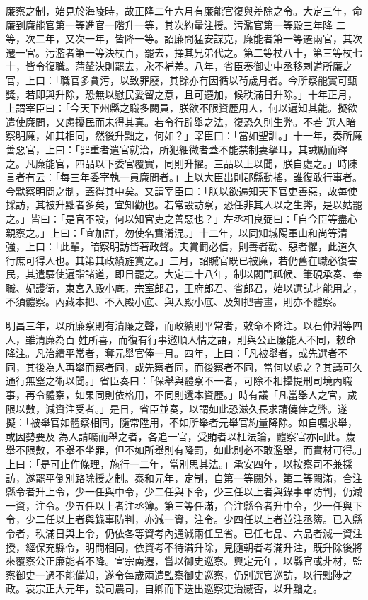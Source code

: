 \begin{pinyinscope}
 廉察之制，始見於海陵時，故正隆二年六月有廉能官復與差除之令。大定三年，命廉到廉能官第一等進官一階升一等，其次約量注授。污濫官第一等殿三年降
 二等，次二年，又次一年，皆降一等。詔廉問猛安謀克，廉能者第一等遷兩官，其次遷一官。污濫者第一等決杖百，罷去，擇其兄弟代之。第二等杖八十，第三等杖七十，皆令復職。蒲輦決則罷去，永不補差。八年，省臣奏御史中丞移剌道所廉之官，上曰：「職官多貪污，以致罪廢，其餘亦有因循以茍歲月者。今所察能實可甄獎，若即與升除，恐無以慰民愛留之意，且可遷加，候秩滿日升除。」十年正月，上謂宰臣曰：「今天下州縣之職多闕員，朕欲不限資歷用人，何以遍知其能。擬欲遣使廉問，又慮擾民而未得其真。若令行辟舉之法，復恐久則生弊。不若
 選人暗察明廉，如其相同，然後升黜之，何如？」宰臣曰：「當如聖訓。」十一年，奏所廉善惡官，上曰：「罪重者遣官就治，所犯細微者蓋不能禁制妻拏耳，其誡勵而釋之。凡廉能官，四品以下委官覆實，同則升擢。三品以上以聞，朕自處之。」時陳言者有云：「每三年委宰執一員廉問者。」上以大臣出則郡縣動搖，誰復敢行事者。今默察明問之制，蓋得其中矣。又謂宰臣曰：「朕以欲遍知天下官吏善惡，故每使採訪，其被升黜者多矣，宜知勸也。若常設訪察，恐任非其人以之生弊，是以姑罷之。」皆曰：「是官不設，何以知官吏之善惡也？」左丞相良弼曰：「自今臣等盡心
 親察之。」上曰：「宜加詳，勿使名實淆混。」十二年，以同知城陽軍山和尚等清強，上曰：「此輩，暗察明訪皆著政聲。夫賞罰必信，則善者勸、惡者懼，此道久行庶可得人也。其第其政績旌賞之。」三月，詔贓官既已被廉，若仍舊在職必復害民，其遣驛使遍詣諸道，即日罷之。大定二十八年，制以閣門祗候、筆硯承奏、奉職、妃護衛，東宮入殿小底，宗室郎君，王府郎君、省郎君，始以選試才能用之，不須體察。內藏本把、不入殿小底、與入殿小底、及知把書畫，則亦不體察。



 明昌三年，以所廉察則有清廉之聲，而政績則平常者，敕命不降注。以石仲淵等四人，雖清廉為百
 姓所喜，而復有行事邀順人情之語，則與公正廉能人不同，敕命降注。凡治績平常者，奪元舉官俸一月。四年，上曰：「凡被舉者，或先選者不同，其後為人再舉而察者同，或先察者同，而後察者不同，當何以處之？其議可久通行無窒之術以聞。」省臣奏曰：「保舉與體察不一者，可除不相攝提刑司境內職事，再令體察，如果同則依格用，不同則還本資歷。」時有議「凡當舉人之官，歲限以數，減資注受者。」是日，省臣並奏，以謂如此恐滋久長求請僥倖之弊。遂擬：「被舉官如體察相同，隨常陞用，不如所舉者元舉官約量降除。如自囑求舉，或因勢要及
 為人請囑而舉之者，各追一官，受賄者以枉法論，體察官亦同此。歲舉不限數，不舉不坐罪，但不如所舉則有降罰，如此則必不敢濫舉，而實材可得。」上曰：「是可止作條理，施行一二年，當別思其法。」承安四年，以按察司不兼採訪，遂罷平倒別路除授之制。泰和元年，定制，自第一等闕外，第二等闕滿，合注縣令者升上令，少一任與中令，少二任與下令，少三任以上者與錄事軍防判，仍減一資，注令。少五任以上者注丞簿。第三等任滿，合注縣令者升中令，少一任與下令，少二任以上者與錄事防判，亦減一資，注令。少四任以上者並注丞簿。已入縣
 令者，秩滿日與上令，仍依各等資考內通減兩任呈省。已任七品、六品者減一資注授，經保充縣令，明問相同，依資考不待滿升除，見隨朝者考滿升注，既升除後將來覆察公正廉能者不降。宣宗南遷，嘗以御史巡察。興定元年，以縣官或非材，監察御史一過不能備知，遂令每歲兩遣監察御史巡察，仍別選官巡訪，以行黜陟之政。哀宗正大元年，設司農司，自卿而下迭出巡察吏治臧否，以升黜之。




\end{pinyinscope}
